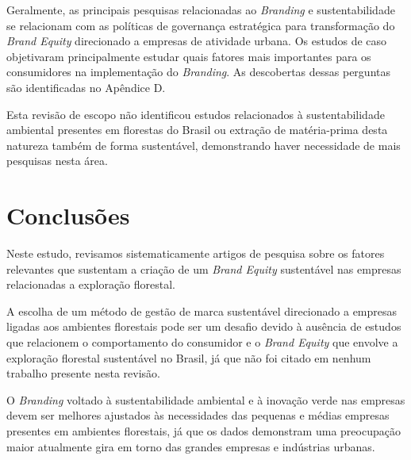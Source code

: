 Geralmente, as principais pesquisas relacionadas ao \textit{Branding} e sustentabilidade se relacionam com as políticas de governança estratégica para transformação do \textit{Brand Equity} direcionado a empresas de atividade urbana. Os estudos de caso objetivaram principalmente estudar quais fatores mais importantes para os consumidores na implementação do \textit{Branding}. As descobertas dessas perguntas são identificadas no Apêndice D. 

Esta revisão de escopo não identificou estudos relacionados à sustentabilidade ambiental presentes em florestas do Brasil ou extração de matéria-prima desta natureza também de forma sustentável, demonstrando haver necessidade de mais pesquisas nesta área. 

\section{Conclusões}

Neste estudo, revisamos sistematicamente artigos de pesquisa sobre os fatores relevantes que sustentam a criação de um \textit{Brand Equity} sustentável nas empresas relacionadas a exploração florestal. 

A escolha de um método de gestão de marca sustentável direcionado a empresas ligadas aos ambientes florestais pode ser um desafio devido à ausência de estudos que relacionem o comportamento do consumidor e o \textit{Brand Equity} que envolve a exploração florestal sustentável no Brasil, já que não foi citado em nenhum trabalho presente nesta revisão. 

O \textit{Branding} voltado à sustentabilidade ambiental e à inovação verde nas empresas devem ser melhores ajustados às necessidades das pequenas e médias empresas presentes em ambientes florestais, já que os dados demonstram uma preocupação maior atualmente gira em torno das grandes empresas e indústrias urbanas.